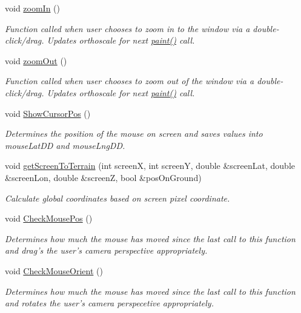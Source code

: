 \begin{DoxyCompactItemize}
void \hyperlink{class_viewer3_d_a5412a627d94ad4d19c3a8c0651c7fe89}{zoomIn} ()
\begin{DoxyCompactList}\small\item\em Function called when user chooses to zoom in to the window via a double-\/click/drag. Updates orthoscale for next \hyperlink{class_viewer3_d_a12869c54575f354e074d2a877ea53eb0}{paint()} call. \end{DoxyCompactList}\item 
void \hyperlink{class_viewer3_d_a3507a963e4f3bf6dcaba60af4f7d1cac}{zoomOut} ()
\begin{DoxyCompactList}\small\item\em Function called when user chooses to zoom out of the window via a double-\/click/drag. Updates orthoscale for next \hyperlink{class_viewer3_d_a12869c54575f354e074d2a877ea53eb0}{paint()} call. \end{DoxyCompactList}\item 
void \hyperlink{class_viewer3_d_ade6e0b1ba4616f43b73df71fc6a5c56c}{ShowCursorPos} ()
\begin{DoxyCompactList}\small\item\em Determines the position of the mouse on screen and saves values into mouseLatDD and mouseLngDD. \end{DoxyCompactList}\item 
void \hyperlink{class_viewer3_d_a2fb408219027d99c76fb4f95673a70d9}{getScreenToTerrain} (int screenX, int screenY, double \&screenLat, double \&screenLon, double \&screenZ, bool \&posOnGround)
\begin{DoxyCompactList}\small\item\em Calculate global coordinates based on screen pixel coordinate. \end{DoxyCompactList}\item 
void \hyperlink{class_viewer3_d_a661d0cae0edf22d2fa14fe1fddc6290c}{CheckMousePos} ()
\begin{DoxyCompactList}\small\item\em Determines how much the mouse has moved since the last call to this function and drag's the user's camera perspective appropriately. \end{DoxyCompactList}\item 
void \hyperlink{class_viewer3_d_a4d8d810a83e4fbfa888e138c39e94226}{CheckMouseOrient} ()
\begin{DoxyCompactList}\small\item\em Determines how much the mouse has moved since the last call to this function and rotates the user's camera perspecetive appropriately. \end{DoxyCompactList}\item 

\end{DoxyCompactItemize}
